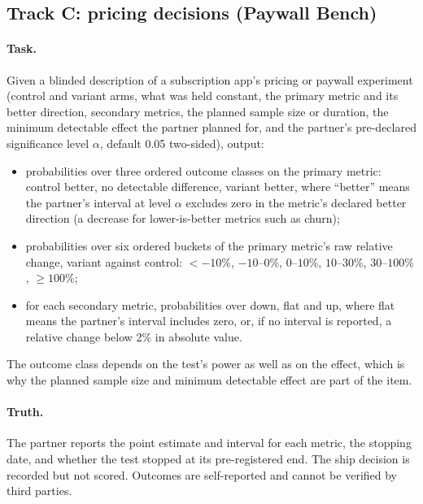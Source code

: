 \documentclass[11pt]{article}
\begin{document}
\subsection{Track C: pricing decisions (Paywall Bench)}

\paragraph{Task.} Given a blinded description of a subscription app's pricing or paywall experiment (control and variant arms, what was held constant, the primary metric and its better direction, secondary metrics, the planned sample size or duration, the minimum detectable effect the partner planned for, and the partner's pre-declared significance level $\alpha$, default 0.05 two-sided), output:
\begin{itemize}
  \item probabilities over three ordered outcome classes on the primary metric: control better, no detectable difference, variant better, where ``better'' means the partner's interval at level $\alpha$ excludes zero in the metric's declared better direction (a decrease for lower-is-better metrics such as churn);
  \item probabilities over six ordered buckets of the primary metric's raw relative change, variant against control: $<-10\%$, $-10$--$0\%$, $0$--$10\%$, $10$--$30\%$, $30$--$100\%$, $\ge 100\%$;
  \item for each secondary metric, probabilities over down, flat and up, where flat means the partner's interval includes zero, or, if no interval is reported, a relative change below 2\% in absolute value.
\end{itemize}
The outcome class depends on the test's power as well as on the effect, which is why the planned sample size and minimum detectable effect are part of the item.

\paragraph{Truth.} The partner reports the point estimate and interval for each metric, the stopping date, and whether the test stopped at its pre-registered end. The ship decision is recorded but not scored. Outcomes are self-reported and cannot be verified by third parties.
\end{document}
